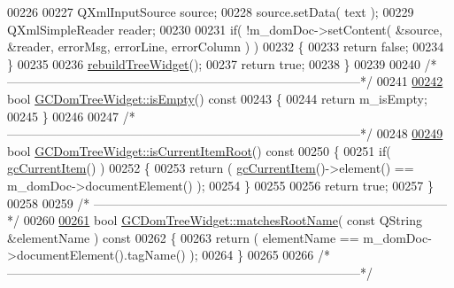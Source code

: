 \begin{DoxyCode}
00226 
00227   QXmlInputSource source;
00228   source.setData( text );
00229   QXmlSimpleReader reader;
00230 
00231   \textcolor{keywordflow}{if}( !m\_domDoc->setContent( &source, &reader, errorMsg, errorLine, errorColumn
       ) )
00232   \{
00233     \textcolor{keywordflow}{return} \textcolor{keyword}{false};
00234   \}
00235 
00236   \hyperlink{class_g_c_dom_tree_widget_a0ac81800aa6d507dd17cbffa6814a632}{rebuildTreeWidget}();
00237   \textcolor{keywordflow}{return} \textcolor{keyword}{true};
00238 \}
00239 
00240 \textcolor{comment}{/*
      --------------------------------------------------------------------------------------*/}
00241 
\hypertarget{gcdomtreewidget_8cpp_source_l00242}{}\hyperlink{class_g_c_dom_tree_widget_a98fe9b2e23ec44757fc4bcc6be7270c0}{00242} \textcolor{keywordtype}{bool} \hyperlink{class_g_c_dom_tree_widget_a98fe9b2e23ec44757fc4bcc6be7270c0}{GCDomTreeWidget::isEmpty}()\textcolor{keyword}{ const}
00243 \textcolor{keyword}{}\{
00244   \textcolor{keywordflow}{return} m\_isEmpty;
00245 \}
00246 
00247 \textcolor{comment}{/*
      --------------------------------------------------------------------------------------*/}
00248 
\hypertarget{gcdomtreewidget_8cpp_source_l00249}{}\hyperlink{class_g_c_dom_tree_widget_a928f82ae2f670600f10cbde52e9188fc}{00249} \textcolor{keywordtype}{bool} \hyperlink{class_g_c_dom_tree_widget_a928f82ae2f670600f10cbde52e9188fc}{GCDomTreeWidget::isCurrentItemRoot}()\textcolor{keyword}{ const}
00250 \textcolor{keyword}{}\{
00251   \textcolor{keywordflow}{if}( \hyperlink{class_g_c_dom_tree_widget_a70d6a155777d375f3923c2d66e702d15}{gcCurrentItem}() )
00252   \{
00253     \textcolor{keywordflow}{return} ( \hyperlink{class_g_c_dom_tree_widget_a70d6a155777d375f3923c2d66e702d15}{gcCurrentItem}()->element() == m\_domDoc->documentElement() );
00254   \}
00255 
00256   \textcolor{keywordflow}{return} \textcolor{keyword}{true};
00257 \}
00258 
00259 \textcolor{comment}{/*
      --------------------------------------------------------------------------------------*/}
00260 
\hypertarget{gcdomtreewidget_8cpp_source_l00261}{}\hyperlink{class_g_c_dom_tree_widget_a7bcb145540df569caeca3119cfebc23c}{00261} \textcolor{keywordtype}{bool} \hyperlink{class_g_c_dom_tree_widget_a7bcb145540df569caeca3119cfebc23c}{GCDomTreeWidget::matchesRootName}( \textcolor{keyword}{const} QString &elementName )\textcolor{keyword}{ const}
00262 \textcolor{keyword}{}\{
00263   \textcolor{keywordflow}{return} ( elementName == m\_domDoc->documentElement().tagName() );
00264 \}
00265 
00266 \textcolor{comment}{/*
      --------------------------------------------------------------------------------------*/}

\end{DoxyCode}
